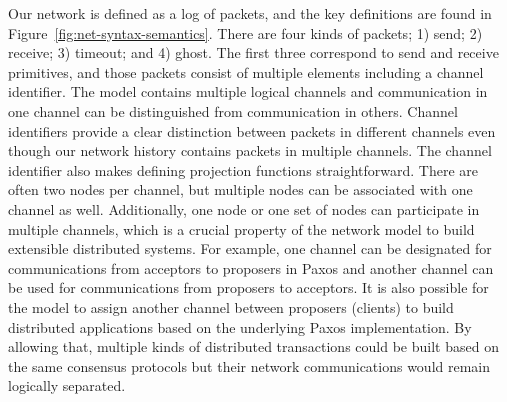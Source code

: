 Our network is defined as a log of packets, and the key definitions are
found in Figure~\ref{fig:net-syntax-semantics}.
There are four kinds of packets; 1) send; 2) receive; 3) timeout; and 4) ghost.
The first three correspond to send and receive primitives, and those 
packets consist of multiple elements including a channel identifier.
The model contains multiple logical channels and communication in one channel can be distinguished from communication in others.
Channel identifiers provide a clear distinction between packets in different channels even though our network history contains 
packets in multiple channels.
The channel identifier also makes defining projection functions straightforward.
There are often two nodes per channel,
but multiple nodes can be associated with one channel as well.
Additionally, one node or one set of nodes can participate in multiple channels, which is a crucial property
of the network model to build extensible distributed systems.
For example, one channel can be designated for communications from acceptors to proposers in Paxos
and another channel can be used for communications from proposers to acceptors.
It is also possible for the model to assign another channel between proposers (clients)
to build distributed applications based on the underlying Paxos implementation.
By allowing that, multiple kinds of distributed transactions could be built based on the same consensus protocols
but their network communications would remain logically separated.

